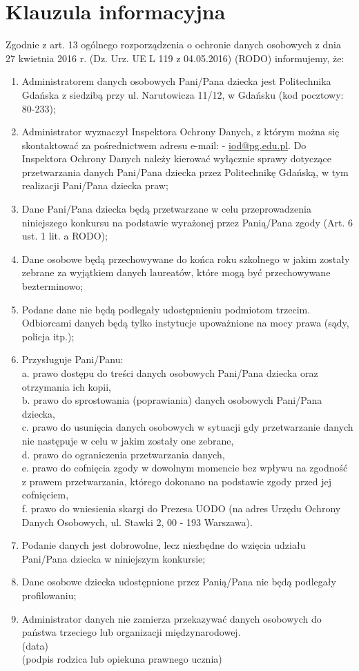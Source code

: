 \documentclass[10pt]{article}
\begin{document}
\section*{Klauzula informacyjna}
Zgodnie z art. 13 ogólnego rozporządzenia o ochronie danych osobowych z dnia 27 kwietnia 2016 r. (Dz. Urz. UE L 119 z 04.05.2016) (RODO) informujemy, że:

\begin{enumerate}
  \item Administratorem danych osobowych Pani/Pana dziecka jest Politechnika Gdańska z siedzibą przy ul. Narutowicza 11/12, w Gdańsku (kod pocztowy: 80-233);
  \item Administrator wyznaczył Inspektora Ochrony Danych, z którym można się skontaktować za pośrednictwem adresu e-mail: - \href{mailto:iod@pg.edu.pl}{iod@pg.edu.pl}. Do Inspektora Ochrony Danych należy kierować wyłącznie sprawy dotyczące przetwarzania danych Pani/Pana dziecka przez Politechnikę Gdańską, w tym realizacji Pani/Pana dziecka praw;
  \item Dane Pani/Pana dziecka będą przetwarzane w celu przeprowadzenia niniejszego konkursu na podstawie wyrażonej przez Panią/Pana zgody (Art. 6 ust. 1 lit. a RODO);
  \item Dane osobowe będą przechowywane do końca roku szkolnego w jakim zostały zebrane za wyjątkiem danych laureatów, które mogą być przechowywane bezterminowo;
  \item Podane dane nie będą podlegały udostępnieniu podmiotom trzecim. Odbiorcami danych będą tylko instytucje upoważnione na mocy prawa (sądy, policja itp.);
  \item Przysługuje Pani/Panu:\\
a. prawo dostępu do treści danych osobowych Pani/Pana dziecka oraz otrzymania ich kopii,\\
b. prawo do sprostowania (poprawiania) danych osobowych Pani/Pana dziecka,\\
c. prawo do usunięcia danych osobowych w sytuacji gdy przetwarzanie danych nie następuje w celu w jakim zostały one zebrane,\\
d. prawo do ograniczenia przetwarzania danych,\\
e. prawo do cofnięcia zgody w dowolnym momencie bez wpływu na zgodność z prawem przetwarzania, którego dokonano na podstawie zgody przed jej cofnięciem,\\
f. prawo do wniesienia skargi do Prezesa UODO (na adres Urzędu Ochrony Danych Osobowych, ul. Stawki 2, 00 - 193 Warszawa).
  \item Podanie danych jest dobrowolne, lecz niezbędne do wzięcia udziału Pani/Pana dziecka w niniejszym konkursie;
  \item Dane osobowe dziecka udostępnione przez Panią/Pana nie będą podlegały profilowaniu;
  \item Administrator danych nie zamierza przekazywać danych osobowych do państwa trzeciego lub organizacji międzynarodowej.\\
(data)\\
(podpis rodzica lub opiekuna prawnego ucznia)
\end{enumerate}
\end{document}
